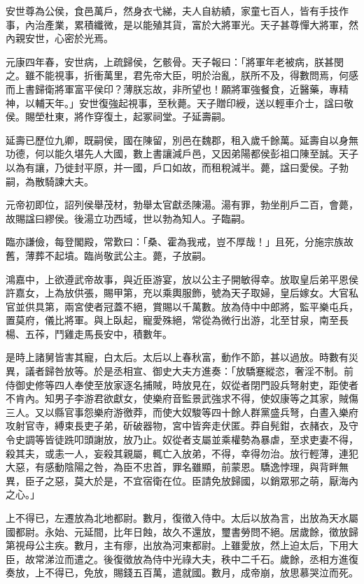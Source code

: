 \begin{pinyinscope}
安世尊為公侯，食邑萬戶，然身衣弋綈，夫人自紡績，家童七百人，皆有手技作事，內治產業，累積纖微，是以能殖其貨，富於大將軍光。天子甚尊憚大將軍，然內親安世，心密於光焉。

元康四年春，安世病，上疏歸侯，乞骸骨。天子報曰：「將軍年老被病，朕甚閔之。雖不能視事，折衝萬里，君先帝大臣，明於治亂，朕所不及，得數問焉，何感而上書歸衛將軍富平侯印？薄朕忘故，非所望也！願將軍強餐食，近醫藥，專精神，以輔天年。」安世復強起視事，至秋薨。天子贈印綬，送以輕車介士，諡曰敬侯。賜塋杜東，將作穿復土，起冢祠堂。子延壽嗣。

延壽已歷位九卿，既嗣侯，國在陳留，別邑在魏郡，租入歲千餘萬。延壽自以身無功德，何以能久堪先人大國，數上書讓減戶邑，又因弟陽都侯彭祖口陳至誠。天子以為有讓，乃徙封平原，并一國，戶口如故，而租稅減半。薨，諡曰愛侯。子勃嗣，為散騎諫大夫。

元帝初即位，詔列侯舉茂材，勃舉太官獻丞陳湯。湯有罪，勃坐削戶二百，會薨，故賜諡曰繆侯。後湯立功西域，世以勃為知人。子臨嗣。

臨亦謙儉，每登閣殿，常歎曰：「桑、霍為我戒，豈不厚哉！」且死，分施宗族故舊，薄葬不起墳。臨尚敬武公主。薨，子放嗣。

鴻嘉中，上欲遵武帝故事，與近臣游宴，放以公主子開敏得幸。放取皇后弟平恩侯許嘉女，上為放供張，賜甲第，充以乘輿服飾，號為天子取婦，皇后嫁女。大官私官並供具第，兩宮使者冠蓋不絕，賞賜以千萬數。放為侍中中郎將，監平樂屯兵，置莫府，儀比將軍。與上臥起，寵愛殊絕，常從為微行出游，北至甘泉，南至長楊、五莋，鬥雞走馬長安中，積數年。

是時上諸舅皆害其寵，白太后。太后以上春秋富，動作不節，甚以過放。時數有災異，議者歸咎放等。於是丞相宣、御史大夫方進奏：「放驕蹇縱恣，奢淫不制。前侍御史修等四人奉使至放家逐名捕賊，時放見在，奴從者閉門設兵弩射吏，距使者不肯內。知男子李游君欲獻女，使樂府音監景武強求不得，使奴康等之其家，賊傷三人。又以縣官事怨樂府游徼莽，而使大奴駿等四十餘人群黨盛兵弩，白晝入樂府攻射官寺，縛束長吏子弟，斫破器物，宮中皆奔走伏匿。莽自髡鉗，衣赭衣，及守令史調等皆徒跣叩頭謝放，放乃止。奴從者支屬並乘權勢為暴虐，至求吏妻不得，殺其夫，或恚一人，妄殺其親屬，輒亡入放弟，不得，幸得勿治。放行輕薄，連犯大惡，有感動陰陽之咎，為臣不忠首，罪名雖顯，前蒙恩。驕逸悖理，與背畔無異，臣子之惡，莫大於是，不宜宿衛在位。臣請免放歸國，以銷眾邪之萌，厭海內之心。」

上不得已，左遷放為北地都尉。數月，復徵入侍中。太后以放為言，出放為天水屬國都尉。永始、元延間，比年日蝕，故久不還放，璽書勞問不絕。居歲餘，徵放歸第視母公主疾。數月，主有瘳，出放為河東都尉。上雖愛放，然上迫太后，下用大臣，故常涕泣而遣之。後復徵放為侍中光祿大夫，秩中二千石。歲餘，丞相方進復奏放，上不得已，免放，賜錢五百萬，遣就國。數月，成帝崩，放思慕哭泣而死。


\end{pinyinscope}
